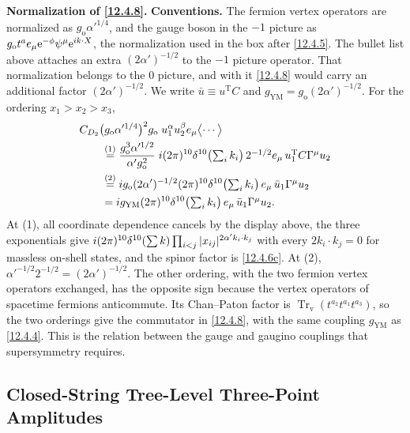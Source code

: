 \begin{tcolorbox}[breakable]
	\begin{remark}
		\textbf{Normalization of \eqref{12.4.8}.} \textbf{Conventions.} The fermion vertex operators are normalized as $g_{\mathrm{o}}\alpha'^{1/4}$, and the gauge boson in the $-1$ picture as $g_{\mathrm{o}}t^{a}e_{\mu}\mathrm{e}^{-\phi}\psi^{\mu}\mathrm{e}^{i k\cdot X}$, the normalization used in the box after \eqref{12.4.5}. The bullet list above attaches an extra $(2\alpha')^{-1/2}$ to the $-1$ picture operator. That normalization belongs to the $0$ picture, and with it \eqref{12.4.8} would carry an additional factor $(2\alpha')^{-1/2}$. We write $\bar u\equiv u^{\mathrm{T}}C$ and $g_{\mathrm{YM}}=g_{\mathrm{o}}(2\alpha')^{-1/2}$. For the ordering $x_{1}>x_{2}>x_{3}$,
		\begin{align*}
			&C_{D_2}\bigl(g_{\mathrm{o}}\alpha'^{1/4}\bigr)^{2}g_{\mathrm{o}}\;u_{1}^{\alpha}u_{2}^{\beta}e_{\mu}\bigl\langle\cdots\bigr\rangle\\
			&\qquad\overset{(1)}{=} \frac{g_{\mathrm{o}}^{3}\alpha'^{1/2}}{\alpha' g_{\mathrm{o}}^{2}}\;i(2\pi)^{10}\delta^{10}\bigl(\textstyle\sum_i k_{i}\bigr)\,2^{-1/2}e_{\mu}\,u_{1}^{\mathrm{T}}C\Gamma^{\mu}u_{2}\\
			&\qquad\overset{(2)}{=} i g_{\mathrm{o}}(2\alpha')^{-1/2}(2\pi)^{10}\delta^{10}\bigl(\textstyle\sum_i k_{i}\bigr)\,e_{\mu}\,\bar u_{1}\Gamma^{\mu}u_{2}\\
			&\qquad=i g_{\mathrm{YM}}(2\pi)^{10}\delta^{10}\bigl(\textstyle\sum_i k_{i}\bigr)\,e_{\mu}\,\bar u_{1}\Gamma^{\mu}u_{2} .
		\end{align*}
		At (1), all coordinate dependence cancels by the display above, the three exponentials give $i(2\pi)^{10}\delta^{10}(\sum k)\prod_{i<j}|x_{ij}|^{2\alpha'k_{i}\cdot k_{j}}$ with every $2k_{i}\cdot k_{j}=0$ for massless on-shell states, and the spinor factor is \eqref{12.4.6c}. At (2), $\alpha'^{-1/2}2^{-1/2}=(2\alpha')^{-1/2}$. The other ordering, with the two fermion vertex operators exchanged, has the opposite sign because the vertex operators of spacetime fermions anticommute. Its Chan--Paton factor is $\operatorname{Tr}_{\mathrm{v}}(t^{a_2}t^{a_1}t^{a_3})$, so the two orderings give the commutator in \eqref{12.4.8}, with the same coupling $g_{\mathrm{YM}}$ as \eqref{12.4.4}. This is the relation between the gauge and gaugino couplings that supersymmetry requires.
	\end{remark}
\end{tcolorbox}

\subsection*{Closed-String Tree-Level Three-Point Amplitudes}

